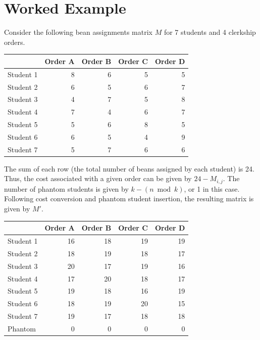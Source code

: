 \documentclass{article}
\begin{document}
\section{Worked Example}
Consider the following bean assignments matrix $M$ for 7 students and 4 clerkship orders.

\begin{table}[h]
	\centering
	\small
	\begin{tabular}{lrrrr}
		\toprule
		         & Order A & Order B & Order C & Order D \\
		\midrule
		Student 1 & 8       & 6       & 5       & 5       \\
		Student 2 & 6       & 5       & 6       & 7       \\
		Student 3 & 4       & 7       & 5       & 8       \\
		Student 4 & 7       & 4       & 6       & 7       \\
		Student 5 & 5       & 6       & 8       & 5       \\
		Student 6 & 6       & 5       & 4       & 9       \\
		Student 7 & 5       & 7       & 6       & 6       \\
		\bottomrule
	\end{tabular}
\end{table}

The sum of each row (the total number of beans assigned by each student) is 24. Thus, the cost associated with a given order can be given by $24 - M_{i,j}$. The number of phantom students is given by $k - (n \bmod k)$, or 1 in this case. Following cost conversion and phantom student insertion, the resulting matrix is given by $M'$.

\begin{table}[h]
	\centering
	\small
	\begin{tabular}{lrrrr}
		\toprule
		         & Order A & Order B & Order C & Order D \\
		\midrule
		Student 1 & 16      & 18      & 19      & 19      \\
		Student 2 & 18      & 19      & 18      & 17      \\
		Student 3 & 20      & 17      & 19      & 16      \\
		Student 4 & 17      & 20      & 18      & 17      \\
		Student 5 & 19      & 18      & 16      & 19      \\
		Student 6 & 18      & 19      & 20      & 15      \\
		Student 7 & 19      & 17      & 18      & 18      \\
		Phantom   & 0       & 0       & 0       & 0       \\
		\bottomrule
	\end{tabular}
\end{table}
\end{document}
